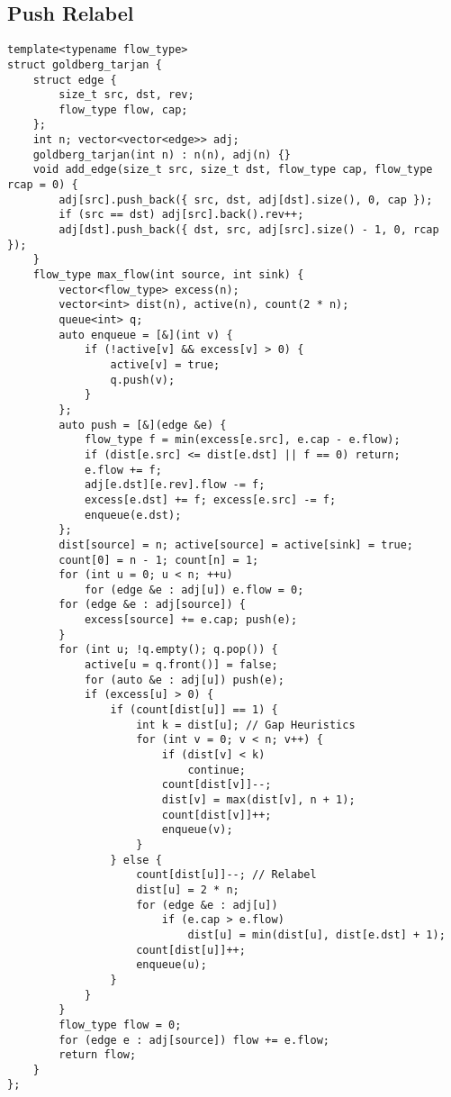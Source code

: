 \documentclass[landscape, 8pt, a4paper, oneside]{extarticle}
\begin{document}
\begin{multicols}{3}
\subsection{Push Relabel}
\begin{verbatim}
template<typename flow_type>
struct goldberg_tarjan {
    struct edge {
        size_t src, dst, rev;
        flow_type flow, cap;
    };
    int n; vector<vector<edge>> adj;
    goldberg_tarjan(int n) : n(n), adj(n) {}
    void add_edge(size_t src, size_t dst, flow_type cap, flow_type rcap = 0) {
        adj[src].push_back({ src, dst, adj[dst].size(), 0, cap });
        if (src == dst)	adj[src].back().rev++;
        adj[dst].push_back({ dst, src, adj[src].size() - 1, 0, rcap });
    }
    flow_type max_flow(int source, int sink) {
        vector<flow_type> excess(n);
        vector<int> dist(n), active(n), count(2 * n);
        queue<int> q;
        auto enqueue = [&](int v) {
            if (!active[v] && excess[v] > 0) {
                active[v] = true;
                q.push(v);
            }
        };
        auto push = [&](edge &e) {
            flow_type f = min(excess[e.src], e.cap - e.flow);
            if (dist[e.src] <= dist[e.dst] || f == 0) return;
            e.flow += f;
            adj[e.dst][e.rev].flow -= f;
            excess[e.dst] += f; excess[e.src] -= f;
            enqueue(e.dst);
        };
        dist[source] = n; active[source] = active[sink] = true;
        count[0] = n - 1; count[n] = 1;
        for (int u = 0; u < n; ++u)
            for (edge &e : adj[u]) e.flow = 0;
        for (edge &e : adj[source]) {
            excess[source] += e.cap; push(e);
        }
        for (int u; !q.empty(); q.pop()) {
            active[u = q.front()] = false;
            for (auto &e : adj[u]) push(e);
            if (excess[u] > 0) {
                if (count[dist[u]] == 1) {
                    int k = dist[u]; // Gap Heuristics
                    for (int v = 0; v < n; v++) {
                        if (dist[v] < k)
                            continue;
                        count[dist[v]]--;
                        dist[v] = max(dist[v], n + 1);
                        count[dist[v]]++;
                        enqueue(v);
                    }
                } else {
                    count[dist[u]]--; // Relabel
                    dist[u] = 2 * n;
                    for (edge &e : adj[u])
                        if (e.cap > e.flow)
                            dist[u] = min(dist[u], dist[e.dst] + 1);
                    count[dist[u]]++;
                    enqueue(u);
                }
            }
        }
        flow_type flow = 0;
        for (edge e : adj[source]) flow += e.flow;
        return flow;
    }
};
\end{verbatim}

\end{multicols}
\end{document}
